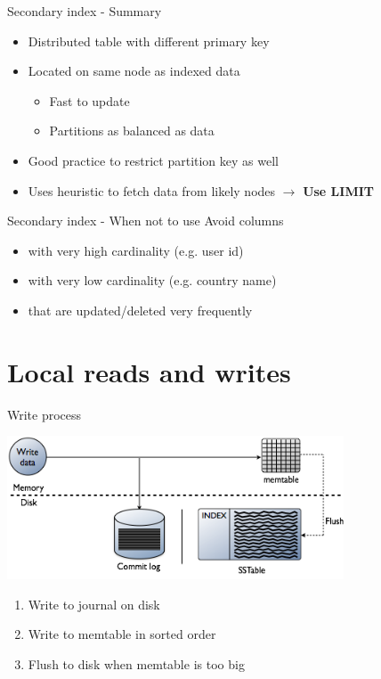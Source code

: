 \documentclass[
  10pt
]{beamer}
\begin{document}
\begin{frame}{Secondary index - Summary}
  \begin{itemize}
    \item<1-> Distributed table with different primary key
    \item<2-> Located on same node as indexed data
      \begin{itemize}
        \item Fast to update
        \item Partitions as balanced as data
      \end{itemize}
    \item<3-> Good practice to restrict partition key as well
    \item<4-> Uses heuristic to fetch data from likely nodes $\rightarrow$ \textbf{Use LIMIT}
  \end{itemize}
\end{frame}

\begin{frame}{Secondary index - When not to use}
  Avoid columns
  \begin{itemize}
    \item<1-> with very high cardinality (e.g. user id)
    \item<2-> with very low cardinality (e.g. country name)
    \item<3-> that are updated/deleted very frequently
  \end{itemize}
\end{frame}

\section{Local reads and writes}  %
\begin{frame}{Write process}
  \begin{center}
    \includegraphics[width=0.75\textwidth]{resources/local_write.png}
    \begin{enumerate}
      \item<+-> Write to journal on disk
      \item<+-> Write to memtable in sorted order
      \item<+-> Flush to disk when memtable is too big
    \end{enumerate}
  \end{center}
\end{frame}
\end{document}
